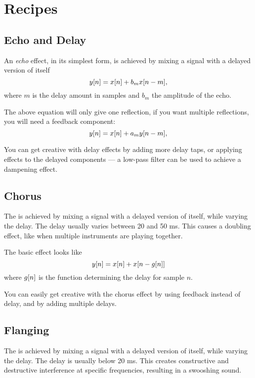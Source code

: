 \documentclass[11pt]{article}
\let\originalleft\left
\let\originalright\right
\renewcommand{\left}{\mathopen{}\mathclose\bgroup\originalleft}
\renewcommand{\right}{\aftergroup\egroup\originalright}
\def\lsqb{\left[}
\def\rsqb{\right]}
\def\sqb#1{\lsqb #1 \rsqb}
\def\ysig{y\sqb{n}}
\begin{document}
\section{Recipes}
\subsection{Echo and Delay}
An \textit{echo} effect, in its simplest form, is achieved by mixing a signal with a delayed version of itself
\begin{equation}
	\ysig = x\sqb{n} + b_m x\sqb{n - m},
\end{equation}
where $m$ is the delay amount in samples and $b_m$ the amplitude of the echo.

The above equation will only give one reflection, if you want multiple reflections, you will need a feedback component:
\begin{equation}
	\ysig = x\sqb{n} + a_m y\sqb{n - m},
\end{equation}

You can get creative with delay effects by adding more delay taps, or applying effects to the delayed components --- a low-pass filter can be used to achieve a dampening effect.

\subsection{Chorus}
The  is achieved by mixing a signal with a delayed version of itself, while varying the delay. The delay usually varies between 20 and 50 ms. This causes a doubling effect, like when multiple instruments are playing together.

The basic effect looks like
\begin{equation}
	\ysig = x\sqb{n} + x\sqb{n - g\sqb{n}}
\end{equation}
where $g\sqb{n}$ is the function determining the delay for sample $n$.

You can easily get creative with the chorus effect by using feedback instead of delay, and by adding multiple delays.

\subsection{Flanging}
The  is achieved by mixing a signal with a delayed version of itself, while varying the delay. The delay is usually below 20 ms. This creates constructive and destructive interference at specific frequencies, resulting in a swooshing sound.
\end{document}
